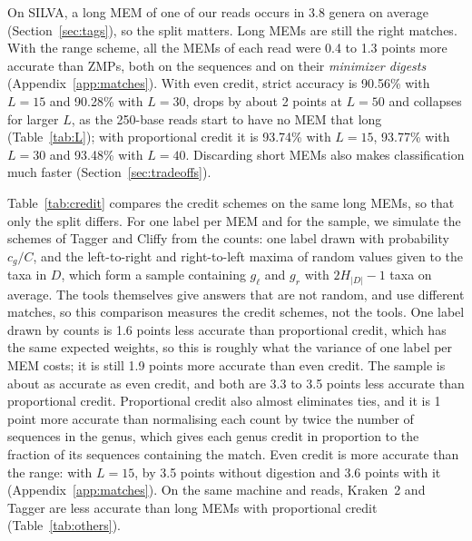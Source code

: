On SILVA, a long MEM of one of our reads occurs in 3.8 genera on average (Section~\ref{sec:tags}), so the split matters.
Long MEMs are still the right matches.
With the range scheme, all the MEMs of each read were 0.4 to 1.3 points more accurate than ZMPs, both on the sequences and on their \emph{minimizer digests}~\cite{RHH+04,AhmedEtAl2023} (Appendix~\ref{app:matches}).
With even credit, strict accuracy is 90.56\% with $L = 15$ and 90.28\% with $L = 30$, drops by about 2 points at $L = 50$ and collapses for larger $L$, as the 250-base reads start to have no MEM that long (Table~\ref{tab:L}); with proportional credit it is 93.74\% with $L = 15$, 93.77\% with $L = 30$ and 93.48\% with $L = 40$.
Discarding short MEMs also makes classification much faster (Section~\ref{sec:tradeoffs}).

Table~\ref{tab:credit} compares the credit schemes on the same long MEMs, so that only the split differs.
For one label per MEM and for the sample, we simulate the schemes of Tagger and Cliffy from the counts: one label drawn with probability $c_g/C$, and the left-to-right and right-to-left maxima of random values given to the taxa in $D$, which form a sample containing $g_\ell$ and $g_r$ with $2 H_{|D|} - 1$ taxa on average.
The tools themselves give answers that are not random, and use different matches, so this comparison measures the credit schemes, not the tools.
One label drawn by counts is 1.6 points less accurate than proportional credit, which has the same expected weights, so this is roughly what the variance of one label per MEM costs; it is still 1.9 points more accurate than even credit.
The sample is about as accurate as even credit, and both are 3.3 to 3.5 points less accurate than proportional credit.
Proportional credit also almost eliminates ties, and it is 1 point more accurate than normalising each count by twice the number of sequences in the genus, which gives each genus credit in proportion to the fraction of its sequences containing the match.
Even credit is more accurate than the range: with $L = 15$, by 3.5 points without digestion and 3.6 points with it (Appendix~\ref{app:matches}).
On the same machine and reads, Kraken~2 and Tagger are less accurate than long MEMs with proportional credit (Table~\ref{tab:others}).

